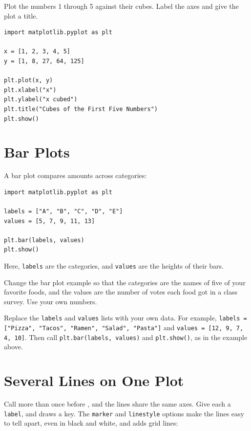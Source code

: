 \begin{Exercise}[title={Cubes}, label=mpl1]
Plot the numbers 1 through 5 against their cubes. Label the axes and give the plot a title.
\end{Exercise}
\begin{Answer}[ref=mpl1]
\begin{verbatim}
import matplotlib.pyplot as plt

x = [1, 2, 3, 4, 5]
y = [1, 8, 27, 64, 125]

plt.plot(x, y)
plt.xlabel("x")
plt.ylabel("x cubed")
plt.title("Cubes of the First Five Numbers")
plt.show()
\end{verbatim}
\end{Answer}

\section{Bar Plots}
A bar plot compares amounts across categories:

\begin{verbatim}
import matplotlib.pyplot as plt

labels = ["A", "B", "C", "D", "E"]
values = [5, 7, 9, 11, 13]

plt.bar(labels, values)
plt.show()
\end{verbatim}

Here, \texttt{labels} are the categories, and \texttt{values} are the heights of
their bars.

\begin{Exercise}[title={Votes}, label=mpl2]
Change the bar plot example so that the categories are the names of five of your favorite foods, and the values are the number of votes each food got in a class survey. Use your own numbers.
\end{Exercise}
\begin{Answer}[ref=mpl2]
Replace the \texttt{labels} and \texttt{values} lists with your own data. For example, \texttt{labels = ["Pizza", "Tacos", "Ramen", "Salad", "Pasta"]} and \texttt{values = [12, 9, 7, 4, 10]}. Then call \texttt{plt.bar(labels, values)} and \texttt{plt.show()}, as in the example above.
\end{Answer}

\section{Several Lines on One Plot}

Call  more than once before , and
the lines share the same axes. Give each a \texttt{label}, and
 draws a key. The \texttt{marker} and
\texttt{linestyle} options make the lines easy to tell apart, even in
black and white, and  adds grid lines:

